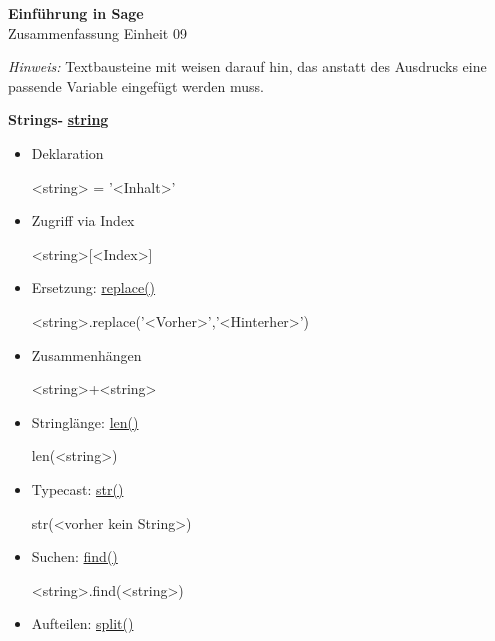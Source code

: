 \documentclass[a4paper,9pt,DIV15,twocolumn]{scrartcl}
\begin{document}
\begin{center}
    \textbf{\LARGE Einführung in Sage}\\
    {\large Zusammenfassung Einheit 09}
\end{center}
\textsl{Hinweis:} Textbausteine mit  weisen darauf hin, das anstatt des Ausdrucks eine passende Variable eingefügt werden muss.

\medskip

\textbf{Strings- }\href{http://docs.python.org/library/string.html?highlight=string.replace#string-constants}{\textbf{string}}
\begin{itemize}
 \item Deklaration
\begin{sagein}
<string> = '<Inhalt>'
\end{sagein}
\item Zugriff via Index
\begin{sagein}
<string>[<Index>]
\end{sagein}
\item Ersetzung: \href{http://docs.python.org/library/string.html?highlight=string.replace#string.replace}{replace()}
\begin{sagein}
<string>.replace('<Vorher>','<Hinterher>')
\end{sagein}
\item Zusammenhängen
\begin{sagein}
 <string>+<string>
\end{sagein}
\item Stringlänge: \href{http://docs.python.org/library/functions.html?highlight=print#len}{len()}
\begin{sagein}
 len(<string>)
\end{sagein}
\item Typecast: \href{http://docs.python.org/library/functions.html?highlight=print#str}{str()}
\begin{sagein}
str(<vorher kein String>)
\end{sagein}
\item Suchen: \href{http://docs.python.org/library/string.html?highlight=string.replace#string.find}{find()}
\begin{sagein}
 <string>.find(<string>)
\end{sagein}
\item Aufteilen: \href{http://docs.python.org/library/string.html?highlight=string.replace#string.split}{split()}
\begin{sagein}

\end{sagein}
\end{itemize}
\end{document}
